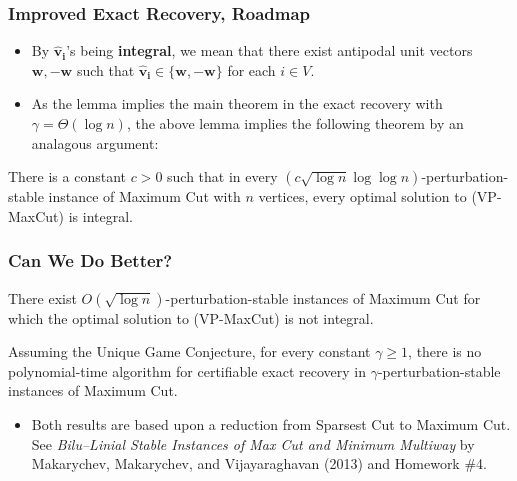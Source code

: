 \documentclass{beamer}
\begin{document}
    \begin{frame}
        \frametitle{Improved Exact Recovery, Roadmap}

        \begin{itemize}
            \item By $\mathbf{\hat v_i}$'s being {\bf integral}, we mean that there exist antipodal unit vectors $\mathbf w, -\mathbf w$ such that $\mathbf{\hat v_i} \in \{ \mathbf w, -\mathbf w \}$ for each $i \in V$. \pause
            \item As the lemma implies the main theorem in the exact recovery with $\gamma = \Theta(\log n)$, the above lemma implies the following theorem by an analagous argument:
        \end{itemize}

        \pause
    
        \begin{theorem}
            There is a constant $c > 0$ such that in every $(c \sqrt{\log n} \log \log n)$-perturbation-stable instance of {\sc Maximum Cut} with $n$ vertices, every optimal solution to {\sc (VP-MaxCut)} is integral.
        \end{theorem}
    \end{frame}

    \begin{frame}
        \frametitle{Can We Do Better?}

        \begin{theorem}
            There exist $O(\sqrt{\log n})$-perturbation-stable instances of {\sc Maximum Cut} for which the optimal solution to {\sc (VP-MaxCut)} is not integral.
        \end{theorem}

        \pause
    
        \begin{theorem}
            Assuming the Unique Game Conjecture, for every constant $\gamma \geq 1$, there is no polynomial-time algorithm for certifiable exact recovery in $\gamma$-perturbation-stable instances of {\sc Maximum Cut}.
        \end{theorem}

        \pause

        \begin{itemize}
            \item Both results are based upon a reduction from {\sc Sparsest Cut} to {\sc Maximum Cut}. See \emph{Bilu–Linial Stable Instances of Max Cut and Minimum Multiway} by Makarychev, Makarychev, and Vijayaraghavan (2013) and Homework \#4.
        \end{itemize}
    \end{frame}
\end{document}
